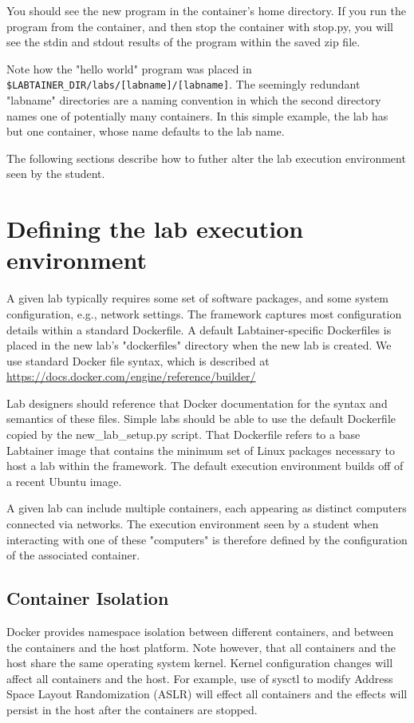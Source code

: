 \documentclass[12pt]{article}
\begin{document}
You should see the new program in the container's
home directory.  If you run the program from the container, and then stop the container
with stop.py, you will see the stdin and stdout results of the program within the
saved zip file.

Note how the "hello world" program was placed in \verb!$LABTAINER_DIR/labs/[labname]/[labname]!.
The seemingly redundant "labname" directories are a naming convention in which the
second directory names one of potentially many containers.  In this simple example,
the lab has but one container, whose name defaults to the lab name.

The following sections describe how to futher alter the lab execution environment seen by 
the student.

\section {Defining the lab execution environment}
A given lab typically requires some set of software packages, and some
system configuration, e.g., network settings.  
The framework captures most configuration details within a standard
Dockerfile.  A default Labtainer-specific Dockerfiles is placed in the new lab's "dockerfiles" 
directory when the new lab is created.  We use standard Docker file syntax, which is described at 
\url{https://docs.docker.com/engine/reference/builder/}

Lab designers should reference that Docker documentation for the 
syntax and semantics of these files.
Simple labs should be able to use the default Dockerfile copied by the 
new\_lab\_setup.py script.  That Dockerfile refers to a base Labtainer
image that contains the minimum set of Linux packages necessary to 
host a lab within the framework.  The default
execution environment builds off of a recent Ubuntu image.

A given lab can include multiple containers, each appearing as distinct
computers connected via networks.  The execution environment seen by a
student when interacting with one of these "computers" is therefore defined
by the configuration of the associated container.  

\subsection {Container Isolation}
Docker provides namespace isolation between different containers, and
between the containers and the host platform.  Note however, that all
containers and the host share the same operating system kernel.  Kernel
configuration changes will affect all containers and the host.  For example,
use of sysctl to modify Address Space Layout Randomization (ASLR) will effect
all containers and the effects will persist in the host after the containers
are stopped.
\end{document}
